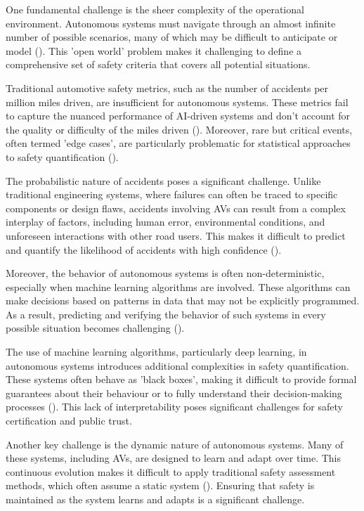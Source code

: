 One fundamental challenge is the sheer complexity of the operational environment. Autonomous systems must navigate through an almost infinite number of possible scenarios, many of which may be difficult to anticipate or model (\cite{Koopman2016}). This 'open world' problem makes it challenging to define a comprehensive set of safety criteria that covers all potential situations.

Traditional automotive safety metrics, such as the number of accidents per million miles driven, are insufficient for autonomous systems. These metrics fail to capture the nuanced performance of AI-driven systems and don't account for the quality or difficulty of the miles driven (\cite{Kalra2016}). Moreover, rare but critical events, often termed 'edge cases', are particularly problematic for statistical approaches to safety quantification (\cite{Koopman2019}).

The probabilistic nature of accidents poses a significant challenge. Unlike traditional engineering systems, where failures can often be traced to specific components or design flaws, accidents involving AVs can result from a complex interplay of factors, including human error, environmental conditions, and unforeseen interactions with other road users. This makes it difficult to predict and quantify the likelihood of accidents with high confidence (\cite{Zhao2020}).

Moreover, the behavior of autonomous systems is often non-deterministic, especially when machine learning algorithms are involved. These algorithms can make decisions based on patterns in data that may not be explicitly programmed. As a result, predicting and verifying the behavior of such systems in every possible situation becomes challenging (\cite{Amodei2016}).

The use of machine learning algorithms, particularly deep learning, in autonomous systems introduces additional complexities in safety quantification. These systems often behave as 'black boxes', making it difficult to provide formal guarantees about their behaviour or to fully understand their decision-making processes (\cite{Burton2017}). This lack of interpretability poses significant challenges for safety certification and public trust.

Another key challenge is the dynamic nature of autonomous systems. Many of these systems, including AVs, are designed to learn and adapt over time. This continuous evolution makes it difficult to apply traditional safety assessment methods, which often assume a static system (\cite{Salay2019}). Ensuring that safety is maintained as the system learns and adapts is a significant challenge.

